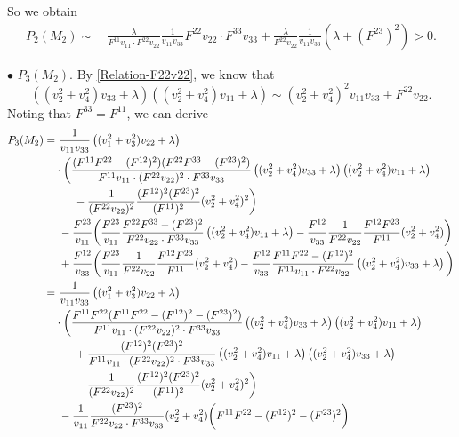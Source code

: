 \documentclass[11pt]{amsart}
\numberwithin{theorem}{section}
\numberwithin{equation}{section}
\begin{document}
So we obtain
\begin{align*}
P_2(M_2)\sim&~\frac{\lambda}{F^{11}v_{11}\cdot F^{22}v_{22}}\frac{1}{v_{11}v_{33}}F^{22}v_{22}\cdot F^{33}v_{33}+\frac{\lambda}{F^{22}v_{22}}\frac{1}{v_{11}v_{33}}\left(\lambda+(F^{23})^2\right)>0.
\end{align*}
 
$\bullet$ $P_3(M_2)$. By \eqref{Relation-F22v22}, we know that $$((v_2^2+v_4^2)v_{33}+\lambda)((v_2^2+v_4^2)v_{11}+\lambda)\sim (v_2^2+v_4^2)^2v_{11}v_{33}+F^{22}v_{22}. $$ Noting that $F^{33}=F^{11}$, we  can derive
\begin{align*}
P_3(M_2)=&~\frac{1}{v_{11}v_{33}}\left((v_1^2+v_3^2)v_{22}+\lambda\right)\\
&\cdot\bigg(\frac{(F^{11}F^{22}-(F^{12})^2)(F^{22}F^{33}-(F^{23})^2)}{F^{11}v_{11}\cdot(F^{22}v_{22})^2\cdot F^{33}v_{33}}\left((v_2^2+v_4^2)v_{33}+\lambda\right)\left((v_2^2+v_4^2)v_{11}+\lambda\right)\\
&\hspace{0.6cm}-\frac{1}{(F^{22}v_{22})^2}\frac{(F^{12})^2(F^{23})^2}{(F^{11})^2}(v_2^2+v_4^2)^2\bigg)\\
&~-\frac{F^{23}}{v_{11}}\bigg(\frac{F^{23}}{v_{11}}\frac{F^{22}F^{33}-(F^{23})^2}{F^{22}v_{22}\cdot F^{33}v_{33}}\left((v_2^2+v_4^2)v_{11}+\lambda\right)-\frac{F^{12}}{v_{33}}\frac{1}{F^{22}v_{22}}\frac{F^{12}F^{23}}{F^{11}}(v_2^2+v_4^2)\bigg)\\
&~+\frac{F^{12}}{v_{33}}\bigg(\frac{F^{23}}{v_{11}}\frac{1}{F^{22}v_{22}}\frac{F^{12}F^{23}}{F^{11}}(v_2^2+v_4^2)-\frac{F^{12}}{v_{33}}\frac{F^{11}F^{22}-(F^{12})^2}{F^{11}v_{11}\cdot F^{22}v_{22}}\left((v_2^2+v_4^2)v_{33}+\lambda\right)\bigg)\\
=&~\frac{1}{v_{11}v_{33}}\left((v_1^2+v_3^2)v_{22}+\lambda\right)\\
&\cdot\bigg(\frac{F^{11}F^{22}(F^{11}F^{22}-(F^{12})^2-(F^{23})^2)}{F^{11}v_{11}\cdot(F^{22}v_{22})^2\cdot  F^{33}v_{33}}\left((v_2^2+v_4^2)v_{33}+\lambda\right)\left((v_2^2+v_4^2)v_{11}+\lambda\right)\\
&\hspace{0.6cm}+\frac{(F^{12})^2(F^{23})^2}{F^{11}v_{11}\cdot(F^{22}v_{22})^2\cdot F^{33}v_{33}}\left((v_2^2+v_4^2)v_{11}+\lambda\right)\left((v_2^2+v_4^2)v_{33}+\lambda\right)\\
&\hspace{0.6cm}-\frac{1}{(F^{22}v_{22})^2}\frac{(F^{12})^2(F^{23})^2}{(F^{11})^2}(v_2^2+v_4^2)^2\bigg)\\
&~-\frac{1}{v_{11}}\frac{(F^{23})^2}{F^{22}v_{22}\cdot F^{33}v_{33}}(v_2^2+v_4^2)\bigg(F^{11}F^{22}-(F^{12})^2-(F^{23})^2\bigg)\\

\end{align*}
\end{document}
